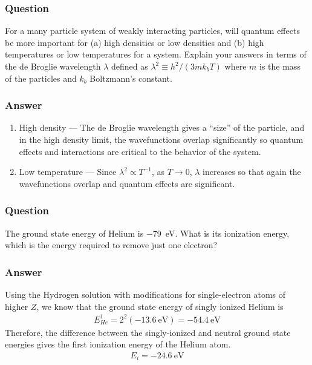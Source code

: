 \subsubsection{Question}

For a many particle system of weakly interacting particles, will quantum
effects be more important for (a) high densities or low densities and (b)
high temperatures or low temperatures for a system. Explain your answers in
terms of the de Broglie wavelength ${\lambda}$ defined as ${\lambda}^2 \equiv h^2/(3mk_bT)$ where
$m$ is the mass of the particles and $k_b$ Boltzmann's constant.

\subsubsection{Answer}
\renewcommand{\labelenumi}{(\alph{enumi})}
\begin{enumerate}
	\item
		High density — The de Broglie wavelength gives a ``size'' of the
		particle, and in the high density limit, the wavefunctions overlap
		significantly so quantum effects and interactions are critical to
		the behavior of the system.
	\item
		Low temperature — Since ${\lambda}^2 \propto T^{-1}$, as $T \rightarrow  0$, ${\lambda}$ increases
		so that again the wavefunctions overlap and quantum effects are
		significant.
\end{enumerate}

\subsubsection{Question}

The ground state energy of Helium is \SI{-79}{\eV}. What is its ionization
energy, which is the energy required to remove just one electron?

\subsubsection{Answer}
Using the Hydrogen solution with modifications for single-electron atoms of
higher $Z$, we know that the ground state energy of singly ionized Helium is
\begin{align*}
	E_{He}^{1} = 2^2 (\SI{-13.6}{\eV}) = \SI{-54.4}{\eV}
\end{align*}
Therefore, the difference between the singly-ionized and neutral ground state
energies gives the first ionization energy of the Helium atom.
\begin{align}
	\boxed{
	E_i = \SI{-24.6}{\eV}
	}
\end{align}

